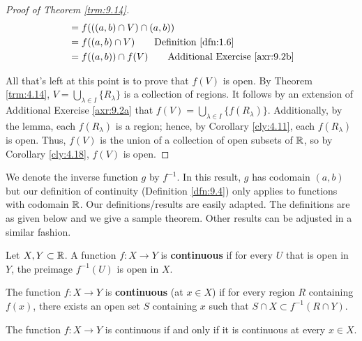 \documentclass[../main.tex]{subfiles}
\begin{document}
\begin{theorem}
\begin{proof}[Proof of Theorem \ref{trm:9.14}]
\begin{align*}
            &= f(((a,b)\cap V)\cap(a,b))\\
            &= f((a,b)\cap V)\tag*{Definition \ref{dfn:1.6}}\\
            &= f((a,b))\cap f(V)\tag*{Additional Exercise \ref{axr:9.2b}}
        \end{align*}\par
        All that's left at this point is to prove that $f(V)$ is open. By Theorem \ref{trm:4.14}, $V=\bigcup_{\lambda\in I}\{R_\lambda\}$ is a collection of regions. It follows by an extension of Additional Exercise \ref{axr:9.2a} that $f(V)=\bigcup_{\lambda\in I}\{f(R_\lambda)\}$. Additionally, by the lemma, each $f(R_\lambda)$ is a region; hence, by Corollary \ref{cly:4.11}, each $f(R_\lambda)$ is open. Thus, $f(V)$ is the union of a collection of open subsets of $\mathbb{R}$, so by Corollary \ref{cly:4.18}, $f(V)$ is open.
    \end{proof}
\end{theorem}

We denote the inverse function $g$ by $f^{-1}$.
In this result, $g$ has codomain $(a,b)$ but our definition of continuity (Definition \ref{dfn:9.4}) only applies to functions with codomain $\mathbb{R}$. Our definitions/results are easily adapted. The definitions are as given below and we give a sample theorem. Other results can be adjusted in a similar fashion.

\begin{definition}\label{dfn:9.15}
    Let $X,Y\subset\mathbb{R}$. A function $f:X\to Y$ is \textbf{continuous} if for every $U$ that is open in $Y$, the preimage $f^{-1}(U)$ is open in $X$.
\end{definition}

\begin{definition}\label{dfn:9.16}
    The function $f:X\to Y$ is \textbf{continuous} (at $x\in X$) if for every region $R$ containing $f(x)$, there exists an open set $S$ containing $x$ such that $S\cap X\subset f^{-1}(R\cap Y)$.
\end{definition}

\begin{theorem}\label{trm:9.17}
    The function $f:X\to Y$ is continuous if and only if it is continuous at every $x\in X$.
\end{theorem}
\end{document}

